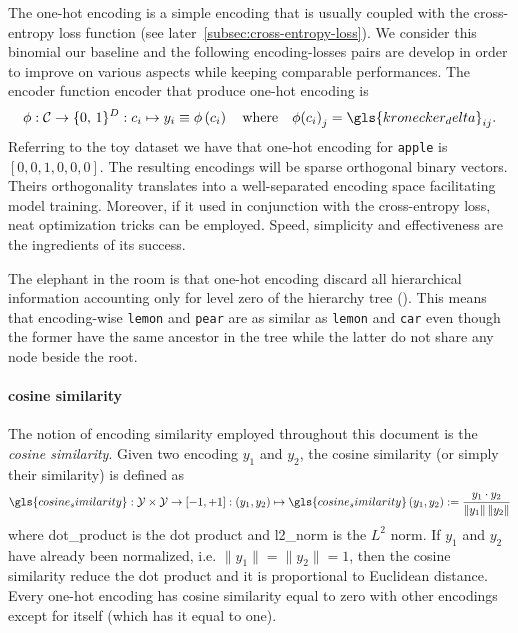 The one-hot encoding is a simple encoding that is usually coupled with the
cross-entropy loss function (see later~\cref{subsec:cross-entropy-loss}). We
consider this binomial our baseline and the following encoding-losses pairs are
develop in order to improve on various aspects while keeping comparable
performances. The encoder function \gls{encoder} that produce one-hot encoding is
\begin{equation}
  \phi: \mathcal{C} \to \{0, \,1\}^{D}
      : c_i \mapsto y_i \equiv \phi \left(c_i\right)
  \quad \text{where} \quad
  \phi{\left(c_i\right)}_j = \gls{kronecker_delta}_{ij}.
  \label{eq:one-hot-encoding}
\end{equation}
Referring to the toy dataset we have that one-hot encoding for \texttt{apple} is
$\left[0, 0, 1, 0, 0, 0\right]$. The resulting encodings will be sparse
orthogonal binary vectors. Theirs orthogonality translates into a well-separated
encoding space facilitating model training. Moreover, if it used in conjunction
with the cross-entropy loss, neat optimization tricks can be employed. Speed,
simplicity and effectiveness are the ingredients of its success.

The elephant in the room is that one-hot encoding discard all hierarchical
information accounting only for level zero of the hierarchy tree
(). This means that encoding-wise \texttt{lemon} and
\texttt{pear} are as similar as \texttt{lemon} and \texttt{car} even though the
former have the same ancestor in the tree while the latter do not share any
node beside the root.

\paragraph{cosine similarity} The notion of encoding similarity employed
throughout this document is the \emph{cosine similarity}. Given two encoding
$y_1$ and $y_2$, the cosine similarity (or simply their similarity) is defined
as
\begin{equation}
  \gls{cosine_similarity}: \mathcal{Y} \times \mathcal{Y} \to \left[-1, +1\right]
  : (y_1, y_2) \mapsto \gls{cosine_similarity} \,(y_1, y_2) :=
  \frac{y_1 \cdot y_2}{\|y_1\| \, \|y_2\|}
  \label{eq:cosine-simiarity}
\end{equation}
where \gls{dot_product} is the dot product and \gls{l2_norm} is the $L^2$ norm.
If $y_1$ and $y_2$ have already been normalized, i.e. $\|y_1\| = \|y_2\| = 1$,
then the cosine similarity reduce the dot product and it is proportional to
Euclidean distance. Every one-hot encoding has cosine similarity equal to zero
with other encodings except for itself (which has it equal to one).


